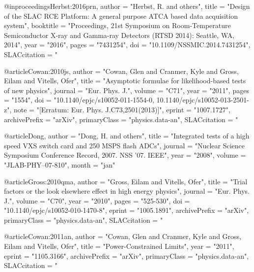 {{{{{{{{{{{{{{{{{@inproceedings{Herbst:2016prn,
      author         = "Herbst, R. and others",
      title          = "{Design of the SLAC RCE Platform: A general purpose ATCA
                        based data acquisition system}",
      booktitle      = "{Proceedings, 21st Symposium on Room-Temperature
                        Semiconductor X-ray and Gamma-ray Detectors (RTSD 2014):
                        Seattle, WA, 2014}",
      year           = "2016",
      pages          = "7431254",
      doi            = "10.1109/NSSMIC.2014.7431254",
      SLACcitation   = "%
}

@article{Cowan:2010js,
      author         = "Cowan, Glen and Cranmer, Kyle and Gross, Eilam and
                        Vitells, Ofer",
      title          = "{Asymptotic formulae for likelihood-based tests of new
                        physics}",
      journal        = "Eur. Phys. J.",
      volume         = "C71",
      year           = "2011",
      pages          = "1554",
      doi            = "10.1140/epjc/s10052-011-1554-0,
                        10.1140/epjc/s10052-013-2501-z",
      note           = "[Erratum: Eur. Phys. J.C73,2501(2013)]",
      eprint         = "1007.1727",
      archivePrefix  = "arXiv",
      primaryClass   = "physics.data-an",
      SLACcitation   = "%
}

@article{Dong,
    author   = "Dong, H. and others",
    title    = "Integrated tests of a high speed VXS switch card and 250 MSPS flash ADCs",
    journal  = "Nuclear Science Symposium Conference Record, 2007. NSS '07. IEEE",
    year     = "2008",
    volume   = "JLAB-PHY--07-810",
    month    = "jan"
}

@article{Gross:2010qma,
      author         = "Gross, Eilam and Vitells, Ofer",
      title          = "{Trial factors or the look elsewhere effect in high
                        energy physics}",
      journal        = "Eur. Phys. J.",
      volume         = "C70",
      year           = "2010",
      pages          = "525-530",
      doi            = "10.1140/epjc/s10052-010-1470-8",
      eprint         = "1005.1891",
      archivePrefix  = "arXiv",
      primaryClass   = "physics.data-an",
      SLACcitation   = "%
}

@article{Cowan:2011an,
      author         = "Cowan, Glen and Cranmer, Kyle and Gross, Eilam and
                        Vitells, Ofer",
      title          = "{Power-Constrained Limits}",
      year           = "2011",
      eprint         = "1105.3166",
      archivePrefix  = "arXiv",
      primaryClass   = "physics.data-an",
      SLACcitation   = "%
}

}}}}}}}}}}}}}}}}}
